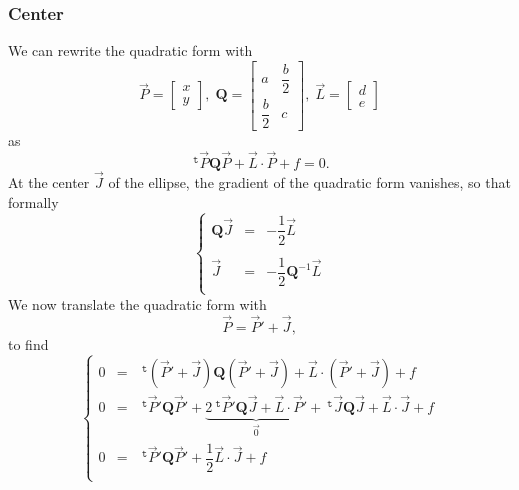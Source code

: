 \documentclass[aps,12pt]{revtex4}
\newcommand{\trn}[1]{~^{\mathtt{t}}{#1}}
\begin{document}
\subsubsection{Center}
We can rewrite the quadratic form with
\begin{equation}
	\vec{P} = \begin{bmatrix}
		x\\
		y
		\end{bmatrix},
		\;
		\bm{Q} = \begin{bmatrix}
		a & \dfrac{b}{2}\\
		\dfrac{b}{2} & c
		\end{bmatrix},\;
		\vec{L} = \begin{bmatrix}
		d\\
		e
		\end{bmatrix}
\end{equation}
as
\begin{equation}
	\trn{\vec{P}} \bm{Q} \vec{P} + \vec{L}\cdot\vec{P} + f = 0.
\end{equation}
At the center $\vec{J}$ of the ellipse, the gradient of the quadratic form 
vanishes, so that formally
\begin{equation}
\left\lbrace
\begin{array}{rcl}
	\bm{Q}\vec{J} & = & -\dfrac{1}{2}\vec{L}\\
	\\
	\vec{J}       & = & -\dfrac{1}{2} \bm{Q}^{-1} \vec{L}\\
\end{array}
\right.
\end{equation}
We now translate the quadratic form with
\begin{equation}
	\vec{P} = \vec{P}' + \vec{J},
\end{equation}
to find
\begin{equation}
\left\lbrace
\begin{array}{rcl}
	0 & = & \trn{(\vec{P}' + \vec{J})} \bm{Q} (\vec{P}' + \vec{J}) + \vec{L}\cdot(\vec{P}' + \vec{J}) + f \\
	0 & = & \trn{\vec{P}'} \bm{Q} \vec{P}' + \underbrace{2 \trn{\vec{P}'} \bm{Q} \vec{J} + \vec{L}\cdot\vec{P}'}_{\vec{0}}+ \trn{\vec{J}} \bm{Q} \vec{J}  + \vec{L}\cdot\vec{J} + f\\
	0 & = & \trn{\vec{P}'} \bm{Q} \vec{P}' + \dfrac{1}{2} \vec{L}\cdot\vec{J} + f\\
\end{array}
\right.
\end{equation}
\end{document}
